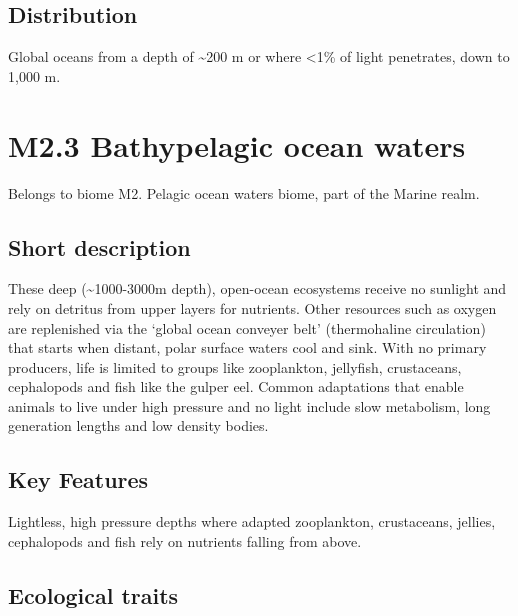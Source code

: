 \documentclass[
  letterpaper,
  DIV=11,
  numbers=noendperiod]{scrartcl}
\begin{document}
\subsection{Distribution}\label{distribution-36}

Global oceans from a depth of \textasciitilde200 m or where \textless1\%
of light penetrates, down to 1,000 m.

\section{M2.3 Bathypelagic ocean
waters}\label{m2.3-bathypelagic-ocean-waters}

Belongs to biome M2. Pelagic ocean waters biome, part of the Marine
realm.

\subsection{Short description}\label{short-description-37}

These deep (\textasciitilde1000-3000m depth), open-ocean ecosystems
receive no sunlight and rely on detritus from upper layers for
nutrients. Other resources such as oxygen are replenished via the
`global ocean conveyer belt' (thermohaline circulation) that starts when
distant, polar surface waters cool and sink. With no primary producers,
life is limited to groups like zooplankton, jellyfish, crustaceans,
cephalopods and fish like the gulper eel. Common adaptations that enable
animals to live under high pressure and no light include slow
metabolism, long generation lengths and low density bodies.

\subsection{Key Features}\label{key-features-37}

Lightless, high pressure depths where adapted zooplankton, crustaceans,
jellies, cephalopods and fish rely on nutrients falling from above.

\subsection{Ecological traits}\label{ecological-traits-37}
\end{document}
